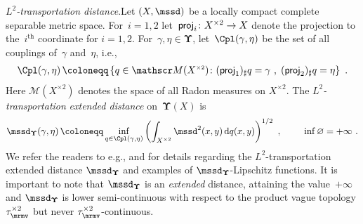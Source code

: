 \documentclass[11pt,letterpaper]{amsart}
\newcommand{\A}{\Sigma} %
\DeclareMathOperator{\eqdef}{\coloneqq}
\newcommand{\rar}{\rightarrow}
\newcommand{\diff}{\mathop{}\!\mathrm{d}}
\newcommand{\set}[1]{\left\{#1\right\}}							%
\newcommand{\paren}[1]{\left(#1\right)}							%
\newcommand{\hotimes}{\widehat{\otimes}}
\newcommand{\tym}[1]{{\scriptscriptstyle{\times #1}}}
\newcommand{\Meas}{\mathscr M}
\newcommand{\pfwd}{\sharp}
\DeclareMathOperator{\emp}{\varnothing} %
\newcommand{\R}{{\mathbb R}}
\newcommand{\comma}{\,\,\mathrm{,}\;\,}
\newcommand{\fstop}{\,\,\mathrm{.}}
\newcommand{\cpl}{q}
\newcommand{\dUpsilon}{{\mathbf \Upsilon}}
\newcommand{\U}{\dUpsilon}
\renewcommand{\1}{\mathbf 1}
\numberwithin{equation}{section}
\theoremstyle{plain}
\theoremstyle{definition}
\newtheorem{defs}[thm]{Definition}%
\theoremstyle{remark}
\newcommand{\proj}{{\sf proj}}
\renewcommand{\paragraph}[1]{\medskip\emph{#1}.\quad}
\begin{document}
\paragraph{$L^2$-transportation distance}Let $(X, \mssd)$ be a locally compact complete separable metric space. For~$i=1,2$ let~$\proj_i\colon X^{\times 2}\rar X$ denote the projection to the~$i^\text{th}$ coordinate for $i=1,2$. 
For~$\gamma,\eta\in \dUpsilon$, let~$\Cpl(\gamma,\eta)$ be the set of all couplings of~$\gamma$ and~$\eta$, i.e., 
\begin{align*}
\Cpl(\gamma,\eta)\eqdef \set{\cpl\in \Meas(X^{\tym{2}}) \colon (\proj_1)_\pfwd \cpl =\gamma \comma (\proj_2)_\pfwd \cpl=\eta} \fstop
\end{align*}
Here $\Meas(X^{\tym{2}})$ denotes the space of all Radon measures on $X^{\tym{2}}$. 
The \emph{$L^2$-transportation}  \emph{extended distance} on~$\dUpsilon(X)$ is
\begin{align}\label{eq:d:W2Upsilon}
\mssd_{\dUpsilon}(\gamma,\eta)\eqdef \inf_{\cpl\in\Cpl(\gamma,\eta)} \paren{\int_{X^{\times 2}} \mssd^2(x,y) \diff\cpl(x,y)}^{1/2}\comma \qquad \inf{\emp}=+\infty \fstop
\end{align}
We refer the readers to e.g., \cite[Prop.~4.27, 4.29, Thm.~4.37, Prop.~5.12]{LzDSSuz21} and \cite[Lem.~4.1, 4.2]{RoeSch99} for details regarding the $L^2$-transportation extended distance $\mssd_{\dUpsilon}$ and examples of $\mssd_{\dUpsilon}$-Lipschitz functions. 
It is important to note that $\mssd_\dUpsilon$ is an {\it extended} distance, attaining the value~$+\infty$ and $\mssd_\U$ is lower semi-continuous with respect to the product vague topology $\tau_\mrmv^{\times 2}$ but never $\tau_\mrmv^{\times 2}$-continuous. 
\end{document}
